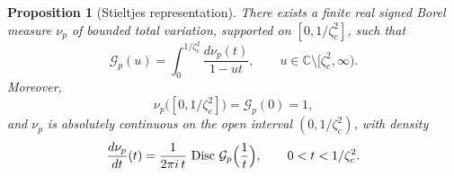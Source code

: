 \documentclass[11pt]{amsart}
\numberwithin{equation}{section}
\theoremstyle{plain}
\newtheorem{proposition}[theorem]{Proposition}
\theoremstyle{definition}
\theoremstyle{remark}
\newcommand{\CC}{\mathbb{C}}
\DeclareMathOperator{\Disc}{Disc}
\begin{document}
\begin{proposition}[Stieltjes representation]
	\label{prop:stieltjes}
	There exists a finite real signed Borel measure \(\nu_p\) of bounded total
	variation, supported on \([0,1/\zeta_c^2]\), such that
	\begin{equation}\label{eq:stieltjes-Gp}
		\mathcal G_p(u)
		=
		\int_0^{1/\zeta_c^2}\frac{d\nu_p(t)}{1-ut},
		\qquad
		u\in\CC\setminus[\zeta_c^2,\infty).
	\end{equation}
	Moreover,
	\[
		\nu_p\bigl([0,1/\zeta_c^2]\bigr)=\mathcal G_p(0)=1,
	\]
	and \(\nu_p\) is absolutely continuous on the open interval
	\((0,1/\zeta_c^2)\), with density
	\begin{equation}\label{eq:mu-jump}
		\frac{d\nu_p}{dt}(t)
		=
		\frac{1}{2\pi i\,t}\,
		\Disc\,\mathcal G_p\Bigl(\frac{1}{t}\Bigr),
		\qquad
		0<t<1/\zeta_c^2.
	\end{equation}
\end{proposition}
\end{document}
